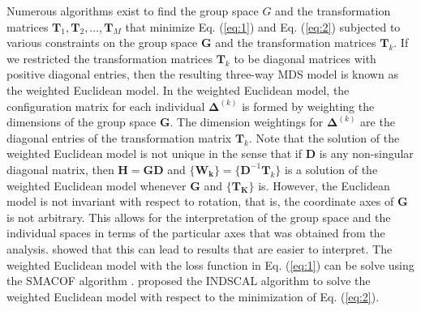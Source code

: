 \documentclass[11pt]{asaproc}
\begin{document}
\noindent Numerous algorithms exist to find the group space $G$ and
the transformation matrices $\mathbf{T}_1, \mathbf{T}_{2}, \dots,
\mathbf{T}_M$ that minimize Eq. (\ref{eq:1}) and Eq. (\ref{eq:2})
subjected to various constraints on the group space $\mathbf{G}$ and
the transformation matrices $\mathbf{T}_k$. If we restricted the
transformation matrices $\mathbf{T}_k$ to be diagonal matrices with
positive diagonal entries, then the resulting three-way MDS model is
known as the weighted Euclidean model. In the weighted Euclidean
model, the configuration matrix for each individual
$\bm{\Delta}^{(k)}$ is formed by weighting the dimensions of the group
space $\mathbf{G}$. The dimension weightings for $\bm{\Delta}^{(k)}$
are the diagonal entries of the transformation matrix
$\mathbf{T}_k$. Note that the solution of the weighted Euclidean model
is not unique in the sense that if $\mathbf{D}$ is any non-singular
diagonal matrix, then $\mathbf{H} = \mathbf{G} \mathbf{D}$ and
$\{\mathbf{W_k}\} = \{\mathbf{D}^{-1} \mathbf{T}_k\}$ is a solution
of the weighted Euclidean model whenever $\mathbf{G}$ and
$\{\mathbf{T_K}\}$ is. However, the Euclidean model is not
invariant with respect to rotation, that is, the coordinate axes of
$\mathbf{G}$ is not arbitrary. This allows for the interpretation of
the group space and the individual spaces in terms of the particular
axes that was obtained from the
analysis. \citet{carroll70:_analy_n_eckar_young} showed that this can
lead to results that are easier to interpret. The weighted Euclidean
model with the loss function in Eq. (\ref{eq:1}) can be solve using
the SMACOF algorithm
\citep{leeuw80:_multiv,leeuw09:_multid_scalin_using_major}.
\citet{carroll70:_analy_n_eckar_young} proposed the INDSCAL algorithm
to solve the weighted Euclidean model with
respect to the minimization of Eq. (\ref{eq:2}). \\ \\
\end{document}
